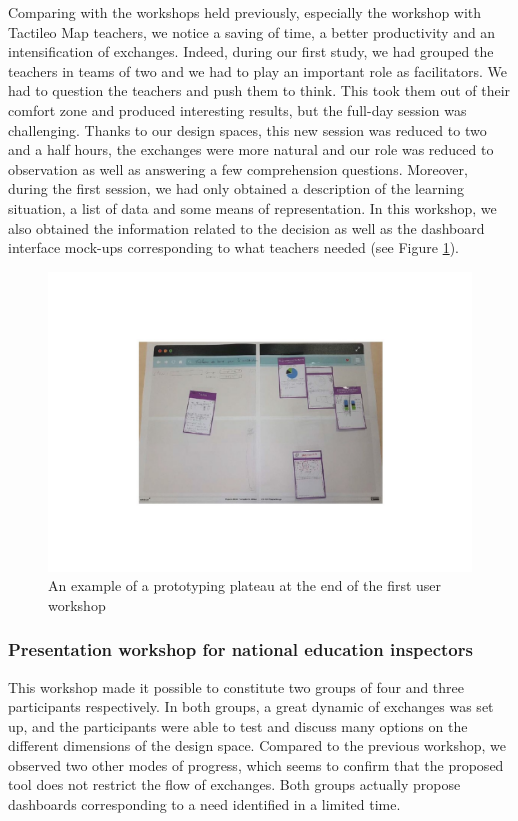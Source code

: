 \documentclass[preprint,12pt]{elsarticle}
\begin{document}
Comparing with the workshops held previously, especially the workshop with Tactileo Map teachers, we notice a saving of time, a better productivity and an intensification of exchanges. Indeed, during our first study, we had grouped the teachers in teams of two and we had to play an important role as facilitators. We had to question the teachers and push them to think. This took them out of their comfort zone and produced interesting results, but the full-day session was challenging. Thanks to our design spaces, this new session was reduced to two and a half hours, the exchanges were more natural and our role was reduced to observation as well as answering a few comprehension questions. Moreover, during the first session, we had only obtained a description of the learning situation, a list of data and some means of representation. In this workshop, we also obtained the information related to the decision as well as the dashboard interface mock-ups corresponding to what teachers needed (see Figure \ref{fig:fig3}).
\begin{figure}[!htp]
    \centering
    \includegraphics[width= \linewidth]{figs/fig3.pdf}
    \caption{An example of a prototyping plateau at the end of the first user workshop}
    \label{fig:fig3}
    \end{figure}
\subsubsection{Presentation workshop for national education inspectors}
This workshop made it possible to constitute two groups of four and three participants respectively. In both groups, a great dynamic of exchanges was set up, and the participants were able to test and discuss many options on the different dimensions of the design space. Compared to the previous workshop, we observed two other modes of progress, which seems to confirm that the proposed tool does not restrict the flow of exchanges. Both groups actually propose dashboards corresponding to a need identified in a limited time. 
\end{document}
